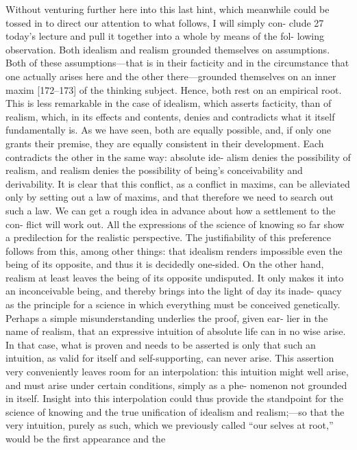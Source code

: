 Without venturing further here into this last hint, which meanwhile
could be tossed in to direct our attention to what follows, I will simply con-
clude 27 today’s lecture and pull it together into a whole by means of the fol-
lowing observation. Both idealism and realism grounded themselves on
assumptions. Both of these assumptions—that is in their facticity and in the
circumstance that one actually arises here and the other there—grounded
themselves on an inner maxim [172–173] of the thinking subject. Hence, both
rest on an empirical root. This is less remarkable in the case of idealism, which
asserts facticity, than of realism, which, in its effects and contents, denies and
contradicts what it itself fundamentally is. As we have seen, both are equally
possible, and, if only one grants their premise, they are equally consistent in
their development. Each contradicts the other in the same way: absolute ide-
alism denies the possibility of realism, and realism denies the possibility of
being’s conceivability and derivability. It is clear that this conflict, as a conflict
in maxims, can be alleviated only by setting out a law of maxims, and that
therefore we need to search out such a law.
We can get a rough idea in advance about how a settlement to the con-
flict will work out. All the expressions of the science of knowing so far show
a predilection for the realistic perspective. The justifiability of this preference
follows from this, among other things: that idealism renders impossible even
the being of its opposite, and thus it is decidedly one-sided. On the other hand,
realism at least leaves the being of its opposite undisputed. It only makes it
into an inconceivable being, and thereby brings into the light of day its inade-
quacy as the principle for a science in which everything must be conceived
genetically. Perhaps a simple misunderstanding underlies the proof, given ear-
lier in the name of realism, that an expressive intuition of absolute life can in
no wise arise. In that case, what is proven and needs to be asserted is only that
such an intuition, as valid for itself and self-supporting, can never arise. This
assertion very conveniently leaves room for an interpolation: this intuition
might well arise, and must arise under certain conditions, simply as a phe-
nomenon not grounded in itself. Insight into this interpolation could thus
provide the standpoint for the science of knowing and the true unification of
idealism and realism;—so that the very intuition, purely as such, which we
previously called “our selves at root,” would be the first appearance and the
